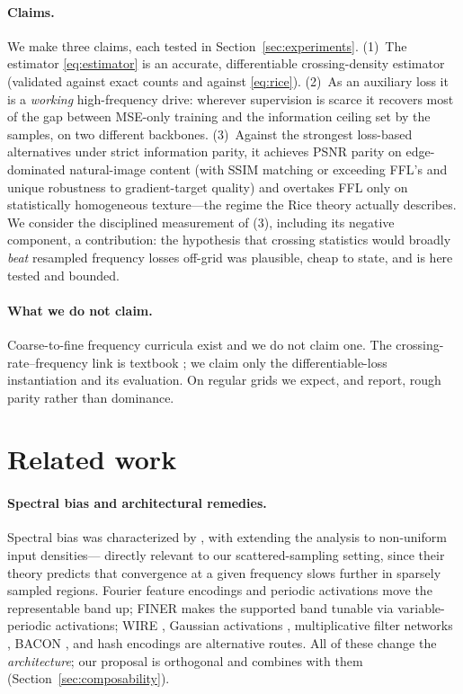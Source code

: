 \documentclass[10pt]{article}
\begin{document}
\paragraph{Claims.} We make three claims, each tested in
Section~\ref{sec:experiments}. (1)~The estimator \eqref{eq:estimator} is an accurate,
differentiable crossing-density estimator (validated against exact counts and against
\eqref{eq:rice}). (2)~As an auxiliary loss it is a \emph{working} high-frequency
drive: wherever supervision is scarce it recovers most of the gap between MSE-only
training and the information ceiling set by the samples, on two different backbones.
(3)~Against the strongest loss-based alternatives under strict information parity, it
achieves PSNR parity on edge-dominated natural-image content (with SSIM matching or
exceeding FFL's and unique robustness to gradient-target quality) and overtakes FFL only on
statistically homogeneous texture---the regime the Rice theory actually describes. We
consider the disciplined measurement of (3), including its negative component, a
contribution: the hypothesis that crossing statistics would broadly \emph{beat}
resampled frequency losses off-grid was plausible, cheap to state, and is here tested
and bounded.

\paragraph{What we do not claim.} Coarse-to-fine frequency curricula exist
\citep{hertz2021sape,yang2023freenerf} and we do not claim one. The
crossing-rate--frequency link is textbook \citep{kedem1986zerocrossings}; we claim only
the differentiable-loss instantiation and its evaluation. On regular grids we expect,
and report, rough parity rather than dominance.

\section{Related work}
\label{sec:related}

\paragraph{Spectral bias and architectural remedies.}
Spectral bias was characterized by \citet{rahaman2019spectral}, with
\citet{basri2020frequency} extending the analysis to non-uniform input densities---%
directly relevant to our scattered-sampling setting, since their theory predicts that
convergence at a given frequency slows further in sparsely sampled regions. Fourier
feature encodings \citep{tancik2020fourier} and periodic activations
\citep{sitzmann2020siren} move the representable band up; FINER \citep{liu2024finer}
makes the supported band tunable via variable-periodic activations; WIRE
\citep{saragadam2023wire}, Gaussian activations \citep{ramasinghe2022beyond},
multiplicative filter networks \citep{fathony2021mfn}, BACON \citep{lindell2022bacon},
and hash encodings \citep{muller2022instant} are alternative routes. All of these change
the \emph{architecture}; our proposal is orthogonal and combines with them
(Section~\ref{sec:composability}).
\end{document}
